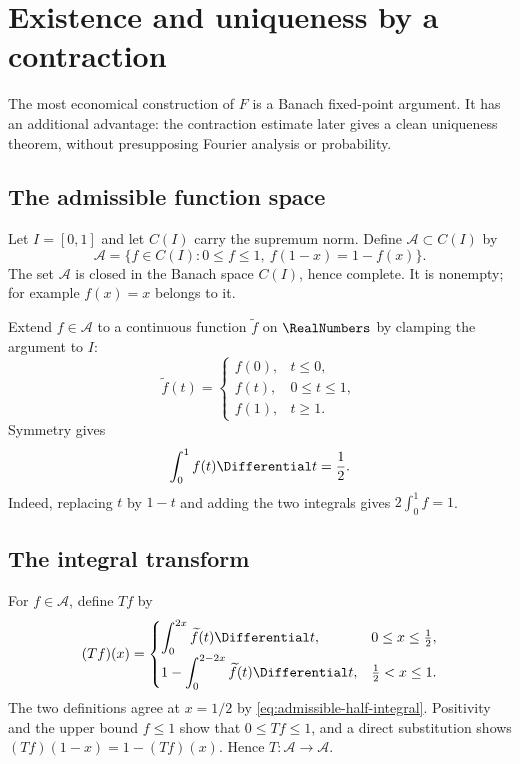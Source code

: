 \documentclass[11pt,oneside]{article}
\theoremstyle{definition}
\theoremstyle{remark}
\begin{document}
\section{Existence and uniqueness by a contraction}
\label{sec:existence}

The most economical construction of $F$ is a Banach fixed-point argument.  It has an
additional advantage: the contraction estimate later gives a clean uniqueness theorem,
without presupposing Fourier analysis or probability.

\subsection{The admissible function space}

Let $I=[0,1]$ and let $C(I)$ carry the supremum norm.  Define $\mathcal A\subset C(I)$ by
\begin{equation}
 \mathcal A=\{f\in C(I):0\le f\le1,
   \ f(1-x)=1-f(x)\}.                                     \label{eq:admissible-space}
\end{equation}
The set $\mathcal A$ is closed in the Banach space $C(I)$, hence complete.  It is nonempty;
for example $f(x)=x$ belongs to it.

Extend $f\in\mathcal A$ to a continuous function $\widetilde f$ on $\RealNumbers$ by clamping the
argument to $I$:
\begin{equation}
 \widetilde f(t)=
 \begin{cases}
  f(0),&t\le0,\\
  f(t),&0\le t\le1,\\
  f(1),&t\ge1.
 \end{cases}                                               \label{eq:clamped-extension}
\end{equation}
Symmetry gives
\begin{equation}
 \int_0^1 f(t)\Differential t=\frac12.                              \label{eq:admissible-half-integral}
\end{equation}
Indeed, replacing $t$ by $1-t$ and adding the two integrals gives $2\int_0^1f=1$.

\subsection{The integral transform}

For $f\in\mathcal A$, define $Tf$ by
\begin{equation}
 (Tf)(x)=
 \begin{cases}
  \displaystyle\int_0^{2x}\widetilde f(t)\Differential t,
       &0\le x\le\tfrac12,\\[1.2ex]
  \displaystyle 1-\int_0^{2-2x}\widetilde f(t)\Differential t,
       &\tfrac12<x\le1.
 \end{cases}                                               \label{eq:fixed-transform}
\end{equation}
The two definitions agree at $x=1/2$ by
\eqref{eq:admissible-half-integral}.  Positivity and the upper bound $f\le1$ show that
$0\le Tf\le1$, and a direct substitution shows $(Tf)(1-x)=1-(Tf)(x)$.  Hence
$T:\mathcal A\to\mathcal A$.
\end{document}

